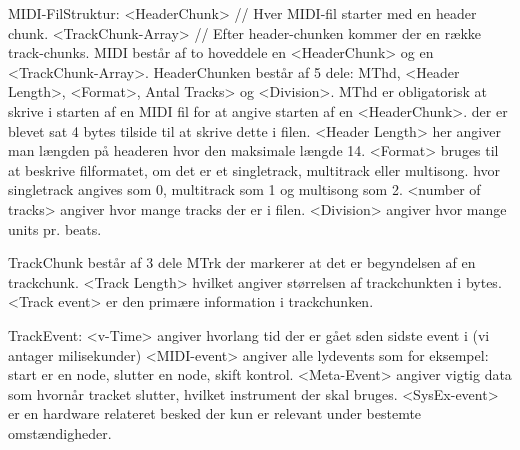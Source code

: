MIDI-FilStruktur:             
<HeaderChunk>                   // Hver MIDI-fil starter med en header chunk.
<TrackChunk-Array>              // Efter header-chunken kommer der en række track-chunks.
MIDI består af to hoveddele en <HeaderChunk>  og en <TrackChunk-Array>.
HeaderChunken består af 5 dele: MThd, <Header Length>, <Format>, Antal Tracks> og <Division>.
MThd er obligatorisk at skrive i starten af en MIDI fil for at angive starten af en <HeaderChunk>. der er blevet sat 4 bytes tilside til at skrive dette i filen. 
<Header Length> her angiver man længden på headeren hvor den maksimale længde 14.
<Format> bruges til at beskrive filformatet, om det er et singletrack, multitrack eller multisong. hvor singletrack angives som 0, multitrack som 1 og multisong som 2.
<number of tracks> angiver hvor mange tracks der er i filen.   
<Division> angiver hvor mange units pr. beats.

TrackChunk består af 3 dele MTrk der markerer at det er begyndelsen af en trackchunk. <Track Length> hvilket angiver størrelsen af trackchunkten i bytes.
<Track event> er den primære information i trackchunken.
                                
TrackEvent:	            
<v-Time> angiver hvorlang tid der er gået sden sidste event i (vi antager milisekunder)
<MIDI-event> angiver alle lydevents som for eksempel: start er en node, slutter en node, skift kontrol.
<Meta-Event> angiver vigtig data som hvornår tracket slutter, hvilket instrument der skal bruges.
<SysEx-event> er en hardware relateret besked der kun er relevant under bestemte omstændigheder.
